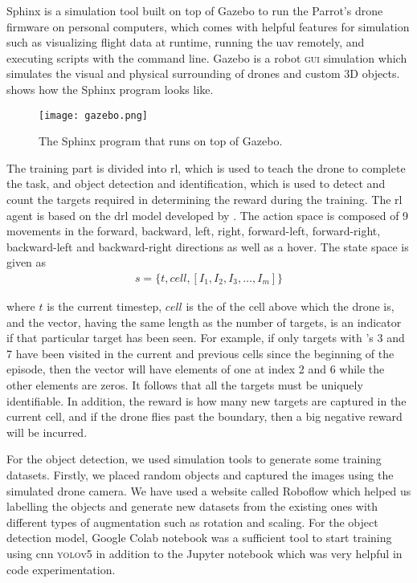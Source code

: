 \documentclass[../main.tex]{subfiles}
\begin{document}
Sphinx is a simulation 
tool built on top of Gazebo 
to run the Parrot's drone firmware on 
personal computers, which comes with helpful 
features for simulation such as visualizing flight 
data at runtime, running the \gls{uav} remotely, 
and executing scripts with the command line. 
Gazebo is a robot \textsc{gui} simulation 
which simulates the visual and physical surrounding 
of drones and custom 3D objects. 
 shows how the Sphinx 
program looks like. 

\begin{figure}[tbp]
    \centering
    \texttt{[image: gazebo.png]}
    \caption{The Sphinx program that runs on top of Gazebo.}
    \label{fig:gazebo}
\end{figure}

The training part is divided into \gls{rl}, 
which is used to teach the \anafi drone to complete the task, 
and object detection and identification, 
which is used to detect and count the targets
required in determining the reward during the training. 
The \gls{rl} agent is based on the \gls{drl} model 
developed by \textcite{Ged21}. The action space is composed 
of 9 movements in the 
forward, backward, left,
right, forward-left, forward-right, backward-left and 
backward-right directions as well as a hover.
The state space is given as
\begin{align}
    s = \{ t, cell, [ I_1, I_2, I_3, \ldots, I_m] \} 
    \label{eq:state-space}
\end{align}

\noindent 
where $t$ is the current timestep, $cell$ is the \id of the
cell above which the drone is, and the vector, having the
same length as the number of targets, is an
indicator if that particular target has been seen. For example,
if only targets with \id's 3 and 7 have been visited
in the current and previous cells since the beginning of the 
episode,
then the vector will have elements of one at index 2 and 6 while
the other elements are zeros.
It follows that all the targets must be uniquely identifiable.
In addition, the reward is how many new targets are captured 
in the current cell,
and if the drone flies past the boundary, then a big negative
reward will be incurred.

For the object detection, we used simulation tools to 
generate some training datasets. Firstly, 
we placed random objects and captured the images 
using the simulated drone camera. We have used a 
website called Roboflow which helped us labelling 
the objects and generate new datasets from the 
existing ones with different types of augmentation 
such as rotation and scaling. 
For the object detection model, Google Colab notebook 
was a sufficient tool to start training using 
\gls{cnn} \textsc{yolo}v5 in addition to the 
Jupyter notebook which was very helpful 
in code experimentation. 
\end{document}
